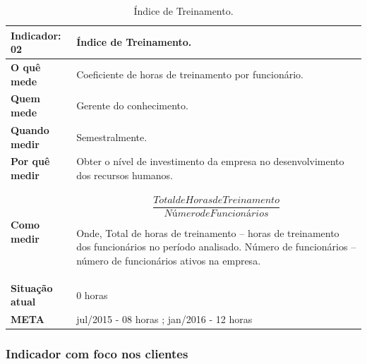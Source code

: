 \begin{table}[H]
\caption{Índice de Treinamento.}
\centering
\begin{tabular}{ | p{3cm} | p{9cm}| }
\hline
\textbf{Indicador: 02} & Índice de Treinamento.\\ \hline
\textbf{O quê mede} & Coeficiente de horas de treinamento por funcionário. \\ \hline
\textbf{Quem mede} & Gerente do conhecimento. \\ \hline
\textbf{Quando medir} & Semestralmente. \\ \hline
\textbf{Por quê medir} & Obter o nível de investimento da empresa no desenvolvimento dos recursos humanos. \\ \hline
\textbf{Como medir} & 
\begin{center}
\begin{equation}
\frac{Total de Horas de Treinamento}{Número de Funcionários}
\end{equation}
\end{center}
Onde,
Total de horas de treinamento  – horas de treinamento dos funcionários no período analisado.
Número de funcionários – número de funcionários ativos na empresa.
 \\ \hline
\textbf{Situação atual} & 0 horas \\ \hline
\textbf{META} & jul/2015 - 08 horas ; jan/2016 - 12 horas  \\ \hline
\end{tabular}
\end{table}

\subsubsection{Indicador com foco nos clientes}

